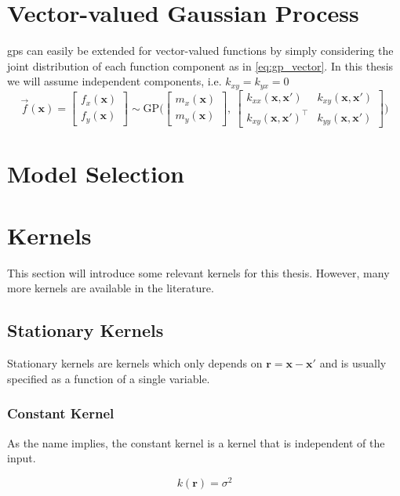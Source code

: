 \section{Vector-valued Gaussian Process}
\acrshort{gp}s can easily be extended for vector-valued functions by simply considering the joint distribution of each function component as in \cref{eq:gp_vector}. In this thesis we will assume independent components, i.e. $k_{xy}=k_{yx}=0$
\begin{equation}\label{eq:gp_vector}
     \vec{f}(\boldsymbol{x}) = \begin{bmatrix} f_x (\boldsymbol{x})\\ f_y (\boldsymbol{x})\end{bmatrix} \sim \text{GP} \big(\begin{bmatrix} m_x(\boldsymbol{x})\\m_y(\boldsymbol{x})\end{bmatrix}, \ \begin{bmatrix}
    k_{xx}(\boldsymbol{x}, \boldsymbol{x}') & k_{xy}(\boldsymbol{x}, \boldsymbol{x}') \\ k_{xy}(\boldsymbol{x}, \boldsymbol{x}')^\intercal & k_{yy}(\boldsymbol{x}, \boldsymbol{x}')
    \end{bmatrix}\big) 
\end{equation}

\section{Model Selection}
\section{Kernels}\label{sec:kernels}
This section will introduce some relevant kernels for this thesis. However, many more kernels are available in the literature. 
\subsection{Stationary Kernels}
Stationary kernels are kernels which only depends on $\boldsymbol{r} = \boldsymbol{x} - \boldsymbol{x'}$ and is usually specified as a function of a single variable.
\subsubsection{Constant Kernel}
As the name implies, the constant kernel is a kernel that is independent of the input.

\begin{equation}
    k(\boldsymbol{r}) = \sigma^2
\end{equation}

